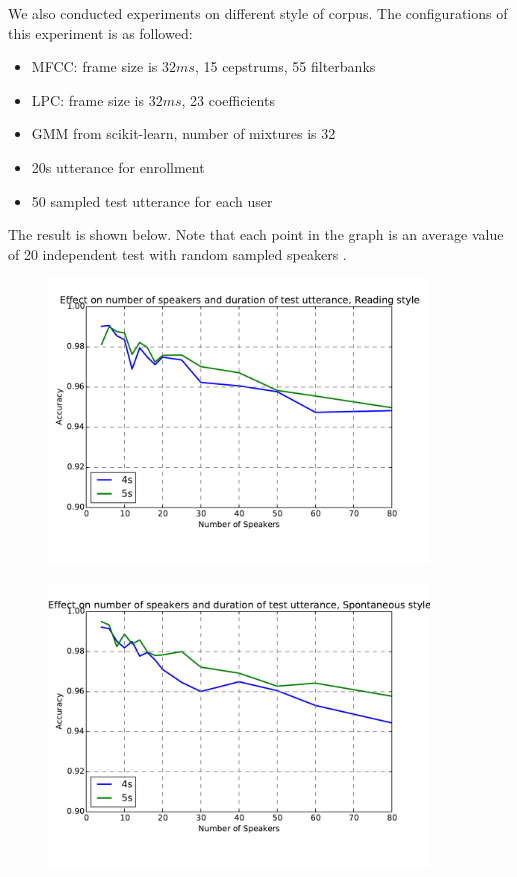 We also conducted experiments on different style of corpus.
The configurations of this experiment is as followed:
\begin{itemize}
  \item MFCC: frame size is $32 ms $, 15 cepstrums, 55 filterbanks
  \item LPC: frame size is $32 ms $, 23 coefficients
  \item GMM from scikit-learn, number of mixtures is 32
  \item 20s utterance for enrollment
  \item 50 sampled test utterance for each user
\end{itemize}

The result is shown below. Note that each point in the graph is an
average value of 20 independent test with random sampled speakers .

\begin{figure}[H]
  \centering
  \includegraphics[width=0.9\textwidth]{img/reading.pdf}
\end{figure}
\begin{figure}[H]
  \centering
  \includegraphics[width=0.9\textwidth]{img/spont.pdf}
\end{figure}


